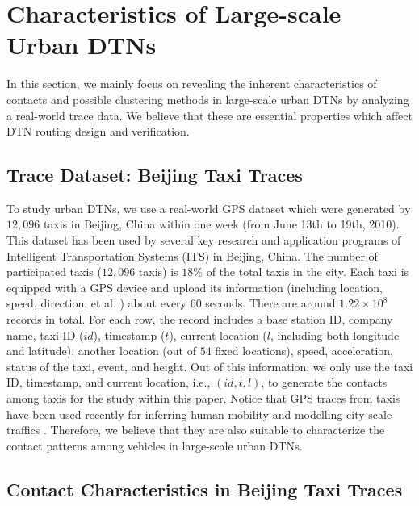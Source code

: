 \documentclass[conference]{IEEEtran}
\begin{document}
\section{Characteristics of Large-scale Urban DTNs}
\label{Section3_characteristics}

In this section, we mainly focus on revealing the inherent characteristics of contacts and possible clustering methods in large-scale urban DTNs by analyzing a real-world trace data. We believe that these are essential properties which affect DTN routing design and verification.


\subsection{Trace Dataset: Beijing Taxi Traces}
\label{Trace Data}

To study urban DTNs, we use a real-world GPS dataset  which were generated by $12,096$ taxis in Beijing, China within one week (from June 13th to 19th, 2010). This dataset has been used by several key research and application programs of Intelligent Transportation Systems (ITS) in Beijing, China. The number of participated taxis ($12,096$ taxis) is $18\%$ of the total taxis in the city. Each taxi is equipped with a GPS device and upload its information (including location, speed, direction, et al. ) about every 60 seconds. There are around $1.22 \times 10^8$ records in total.
For each row, the record includes a base station ID, company name, taxi ID ($id$), timestamp ($t$), current location ($l$, including both longitude and latitude), another location (out of $54$ fixed locations), speed, acceleration, status of the taxi, event, and height. Out of this information, we only use the taxi ID, timestamp, and current location, i.e., $(id,t,l)$,  to generate the contacts among taxis for the study within this paper.  Notice that GPS traces from taxis have been used recently for inferring human mobility \cite{Ganti:2013:IHM:2493432.2493466} and modelling city-scale traffics \cite{Aslam:2012:CTE:2426656.2426671}. Therefore, we believe that they are also suitable to characterize the contact patterns among vehicles in large-scale urban DTNs.

\subsection{Contact Characteristics in Beijing Taxi Traces}
\label{Contact Characteristics}
\end{document}
